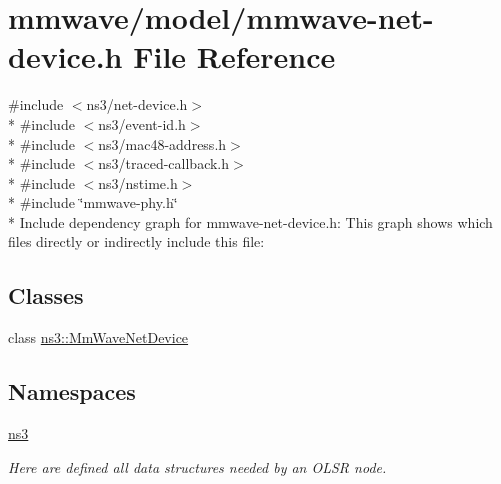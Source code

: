 \hypertarget{mmwave-net-device_8h}{}\section{mmwave/model/mmwave-\/net-\/device.h File Reference}
\label{mmwave-net-device_8h}
{\ttfamily \#include $<$ns3/net-\/device.\+h$>$}\\*
{\ttfamily \#include $<$ns3/event-\/id.\+h$>$}\\*
{\ttfamily \#include $<$ns3/mac48-\/address.\+h$>$}\\*
{\ttfamily \#include $<$ns3/traced-\/callback.\+h$>$}\\*
{\ttfamily \#include $<$ns3/nstime.\+h$>$}\\*
{\ttfamily \#include \char`\"{}mmwave-\/phy.\+h\char`\"{}}\\*
Include dependency graph for mmwave-\/net-\/device.h\+:
This graph shows which files directly or indirectly include this file\+:
\subsection*{Classes}
\begin{DoxyCompactItemize}
\item 
class \hyperlink{classns3_1_1MmWaveNetDevice}{ns3\+::\+Mm\+Wave\+Net\+Device}
\end{DoxyCompactItemize}
\subsection*{Namespaces}
\begin{DoxyCompactItemize}
\item 
 \hyperlink{namespacens3}{ns3}
\begin{DoxyCompactList}\small\item\em Here are defined all data structures needed by an O\+L\+SR node. \end{DoxyCompactList}\end{DoxyCompactItemize}
